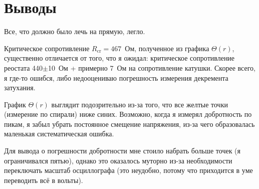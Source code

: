 \documentclass[a4paper, 12pt]{article}
\begin{document}
\section{Выводы}

Все, что должно было лечь на прямую, легло.

Критическое сопротивление $R_{\text{cr}} = 467$~Ом, полученное из графика $\Theta(r)$, существенно отличается от того, что я ожидал: критическое сопротивление реостата 440$\pm$10~Ом + примерно 7~Ом на сопротивление катушки.
Скорее всего, я где-то ошибся, либо недооцениваю погрешность измерения декремента затухания.

График $\Theta(r)$ выглядит подозрительно из-за того, что все желтые точки (измерение по спирали) ниже синих.
Возможно, когда я измерял добротность по пикам, я забыл убрать постоянное смещение напряжения, из-за чего образовалась маленькая систематическая ошибка.

Для вывода о погрешности добротности мне стоило набрать больше точек (я ограничивался пятью), однако это оказалось муторно из-за необходимости переключать масштаб осциллографа (это неудобно, потому что приходится в уме переводить всё в вольты).
\end{document}
